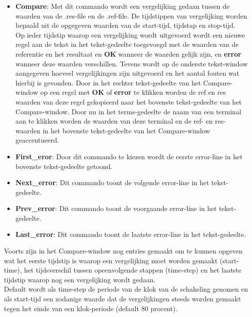 \begin{itemize}
\item {\bf Compare}: Met dit commando wordt een vergelijking gedaan tussen de waarden
               van de .res-file en de .ref-file. De tijdstippen van vergelijking
               worden bepaald uit de opgegeven waarden van de start-tijd,
               tijdstap en stop-tijd.\\
               Op ieder tijdstip waarop een vergelijking wordt uitgevoerd
               wordt een nieuwe regel aan de tekst in het tekst-gedeelte
               toegevoegd met de waarden van de referentie en het resultaat
               en {\bf OK} wanneer de waarden gelijk zijn, en {\bf error} wanneer
               deze waarden verschillen. Tevens wordt op de onderste
               tekst-window aangegeven hoeveel vergelijkingen zijn uitgevoerd
               en het aantal fouten wat hierbij is gevonden.
               Door in het rechter tekst-gedeelte van het Compare-window op
               een regel met {\bf OK} of {\bf error} te klikken worden de ref en
               res waarden van deze regel gekopieerd naar het bovenste
               tekst-gedeelte van het Compare-window. Door nu in het
               terms-gedeelte de naam van een terminal aan te klikken
               worden de waarden van deze terminal en de ref- en res-waarden
               in het bovenste tekst-gedeelte van het Compare-window
               geaccentueerd.
\item {\bf First\_eror}: Door dit commando te kiezen wordt de eerste error-line
                  in het bovenste tekst-gedeelte getoond.
\item {\bf Next\_error}: Dit commando toont de volgende error-line
                  in het tekst-gedeelte.
\item {\bf Prev\_error}: Dit commando toont de voorgaande error-line
                  in het tekst-gedeelte.
\item {\bf Last\_error}: Dit commando toont de laatste error-line
                  in het tekst-gedeelte.
\end{itemize}
Voorts zijn in het Compare-window nog entries gemaakt om te kunnen
opgeven wat het eerste tijdstip is waarop een vergelijking moet worden
gemaakt (start-time), het tijdsverschil tussen opeenvolgende stappen (time-step)
en het laatste tijdstip waarop nog een vergelijking wordt gedaan.\\
Default wordt als time-step de periode van de klok van de schakeling
genomen en als start-tijd een zodanige waarde dat de vergelijkingen steeds
worden gemaakt tegen het einde van een klok-periode (default 80 procent).

